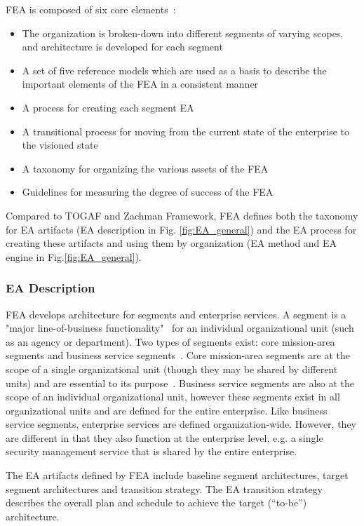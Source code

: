 FEA is composed of six core elements~\cite{sessions2007}:
\begin{itemize}
    \item The organization is broken-down into different segments of varying scopes, and architecture is developed for each segment
    \item A set of five reference models which are used as a basis to describe the important elements of the FEA in a consistent manner
    \item A process for creating each segment EA
    \item A transitional process for moving from the current state of the enterprise to the visioned state
    \item A taxonomy for organizing the various assets of the FEA
    \item Guidelines for measuring the degree of success of the FEA
\end{itemize}
Compared to TOGAF and Zachman Framework, FEA defines both the taxonomy for EA artifacts (EA description in Fig. \ref{fig:EA_general}) and the EA process for creating these artifacts and using them by organization (EA method and EA engine in Fig.\ref{fig:EA_general}). 

\subsubsection{EA Description}
FEA develops architecture for segments and enterprise services. A segment is a "major line-of-business functionality"~\cite{sessions2007} for an individual organizational unit (such as an agency or department). Two types of segments exist: core mission-area segments and business service segments~\cite{FEA_PMO2007}. Core mission-area segments are at the scope of a single organizational unit (though they may be shared by different units) and are essential to its purpose~\cite{sessions2007,FEA_PMO2007}. Business service segments are also at the scope of an individual organizational unit, however these segments exist in all organizational units and are defined for the entire enterprise. Like business service segments, enterprise services are defined organization-wide. However, they are different in that they also function at the enterprise level, e.g. a single security management service that is shared by the entire enterprise. 

The EA artifacts defined by FEA include  baseline segment architectures, target segment architectures and transition strategy. The EA transition strategy describes the overall plan and schedule to achieve the target (“to-be”) architecture.

